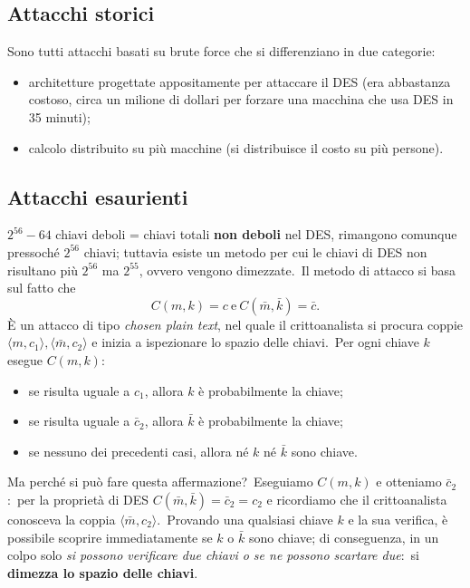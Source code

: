 \subsection{Attacchi storici}

Sono tutti attacchi basati su brute force che si differenziano in due categorie:

\begin{itemize}
    \item architetture progettate appositamente per attaccare il DES (era abbastanza costoso, circa un milione di dollari per forzare una macchina che usa DES in 35 minuti);
    \item calcolo distribuito su più macchine (si distribuisce il costo su più persone).
\end{itemize}

\subsection{Attacchi esaurienti}

$2^{56} - 64$ chiavi deboli = chiavi totali \textbf{non deboli} nel DES, rimangono comunque pressoché $2^{56}$ chiavi; tuttavia esiste un metodo per cui le chiavi di DES non risultano più $2^{56}$ ma $2^{55}$, ovvero vengono dimezzate.\
Il metodo di attacco si basa sul fatto che
\[C(m, k) = c\ \mathrm{e}\ C(\bar{m}, \bar{k}) = \bar{c}.\]
È un attacco di tipo \textit{chosen plain text}, nel quale il crittoanalista si procura coppie $\langle m, c_1 \rangle , \langle\bar{m}, c_2 \rangle$ e inizia a ispezionare lo spazio delle chiavi.\
Per ogni chiave $k$ esegue $C(m, k)$:\
\begin{itemize}
    \item se risulta uguale a $c_1$, allora $k$ è probabilmente la chiave;
    \item se risulta uguale a $\bar{c}_2$, allora $\bar{k}$ è probabilmente la chiave;
    \item se nessuno dei precedenti casi, allora né $k$ né $\bar{k}$ sono chiave.\
\end{itemize}
Ma perché si può fare questa affermazione?\
Eseguiamo $C(m, k)$ e otteniamo $\bar{c}_2$:\ per la proprietà di DES $C(\bar{m}, \bar{k}) = \bar{c}_2 = c_2$ e ricordiamo che il crittoanalista conosceva la coppia $\langle \bar{m}, c_2 \rangle$.\
Provando una qualsiasi chiave $k$ e la sua verifica, è possibile scoprire immediatamente se $k$ o $\bar{k}$ sono chiave; di conseguenza, in un colpo solo \textit{si possono verificare due chiavi o se ne possono scartare due}:\ si \textbf{dimezza lo spazio delle chiavi}.\

